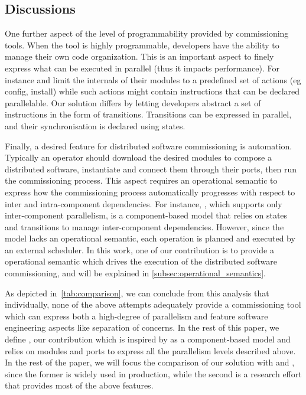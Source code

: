 \subsection{Discussions}

One further aspect of the level of programmability provided by commissioning
tools. When the tool is highly programmable, developers have the ability to
manage their own code organization. This is an important aspect to finely
express what can be executed in parallel (thus it impacts performance). For
instance \deployware and \juju limit the internals of their modules to a
predefined set of actions (eg config, install) while such actions might contain
instructions that can be declared parallelable.
%
Our solution differs by letting developers abstract a set of instructions in the
form of transitions. Transitions can be expressed in parallel, and their
synchronisation is declared using states.

Finally, a desired feature for distributed software commissioning is automation.
Typically an operator should download the desired modules to compose a
distributed software, instantiate and connect them through their ports, then run
the commissioning process. This aspect requires an operational semantic to
express how the commissioning process automatically progresses with respect to
inter and intra-component dependencies. For instance, \aeolus, which supports
only inter-component parallelism, is a component-based model that relies on
states and transitions to manage inter-component dependencies. However, since
the model lacks an operational semantic, each operation is planned and executed
by an external scheduler. In this work, one of our contribution is to provide a
operational semantic which drives the execution of the distributed software
commissioning, and will be explained in \cref{subsec:operational_semantics}.

As depicted in~\cref{tab:comparison}, we can conclude from this analysis that
individually, none of the above attempts adequately provide a commissioning tool
which can express both a high-degree of parallelism and feature software
engineering aspects like separation of concerns.
In the rest of this paper, we define \mad, our contribution which is inspired by
\aeolus as a component-based model and relies on modules and ports to express all
the parallelism levels described above. In the rest of the paper, we will
focus the comparison of our solution with \ansible and \aeolus, since the former
is widely used in production, while the second is a research effort that
provides most of the above features.

